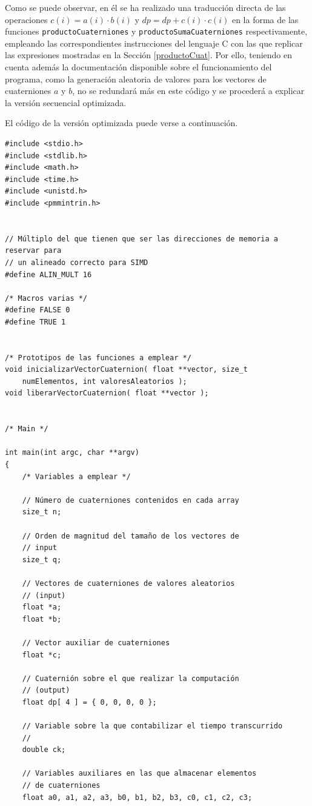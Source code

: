 \documentclass[conference]{IEEEtran}
\begin{document}
Como se puede observar, en él se ha realizado una traducción directa de las operaciones $c(i) = a(i) \cdot b(i)$ y $dp = dp + c(i) \cdot c(i)$ en la forma de las funciones \texttt{productoCuaterniones} y \texttt{productoSumaCuaterniones} respectivamente, empleando las correspondientes instrucciones del lenguaje C con las que replicar las expresiones mostradas en la Sección \ref{productoCuat}. Por ello, teniendo en cuenta además la documentación disponible sobre el funcionamiento del programa, como la generación aleatoria de valores para los vectores de cuaterniones $a$ y $b$, no se redundará más en este código y se procederá a explicar la versión secuencial optimizada.

El código de la versión optimizada puede verse a continuación.

\begin{lstlisting}[style=CStyle, title=Código secuencial optimizado.]
#include <stdio.h>
#include <stdlib.h>
#include <math.h>
#include <time.h>
#include <unistd.h>
#include <pmmintrin.h>


// Múltiplo del que tienen que ser las direcciones de memoria a reservar para
// un alineado correcto para SIMD
#define ALIN_MULT 16

/* Macros varias */
#define FALSE 0
#define TRUE 1


/* Prototipos de las funciones a emplear */
void inicializarVectorCuaternion( float **vector, size_t
    numElementos, int valoresAleatorios );
void liberarVectorCuaternion( float **vector );


/* Main */

int main(int argc, char **argv)
{
    /* Variables a emplear */

    // Número de cuaterniones contenidos en cada array
    size_t n;

    // Orden de magnitud del tamaño de los vectores de
    // input
    size_t q;

    // Vectores de cuaterniones de valores aleatorios
    // (input)
    float *a;
    float *b;

    // Vector auxiliar de cuaterniones
    float *c;

    // Cuaternión sobre el que realizar la computación
    // (output)
    float dp[ 4 ] = { 0, 0, 0, 0 };

    // Variable sobre la que contabilizar el tiempo transcurrido
    // 
    double ck;

    // Variables auxiliares en las que almacenar elementos
    // de cuaterniones
    float a0, a1, a2, a3, b0, b1, b2, b3, c0, c1, c2, c3;


\end{lstlisting}
\end{document}
